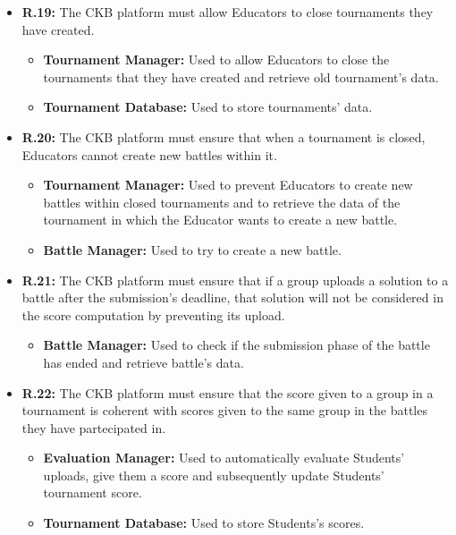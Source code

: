\documentclass{article}
\begin{document}
{\begin{itemize}
    \item \textbf{R.19:} The CKB platform must allow Educators to close tournaments they have created.
          \begin{itemize}
              \item \textbf{Tournament Manager:} Used to allow Educators to close the tournaments that they have
              created and retrieve old tournament's data.
              \item \textbf{Tournament Database:} Used to store tournaments' data.
          \end{itemize}
    \item \textbf{R.20:} The CKB platform must ensure that when a tournament is closed, Educators cannot create new battles
          within it.
          \begin{itemize}
              \item \textbf{Tournament Manager:} Used to prevent Educators to create new battles
                within closed tournaments and to retrieve the data of the tournament in which
                the Educator wants to create a new battle.
            \item \textbf{Battle Manager:} Used to try to create a new battle.
          \end{itemize}
    \item \textbf{R.21:} The CKB platform must ensure that if a group uploads a solution to a battle after the submission's deadline,
          that solution will not be considered in the score computation by preventing its upload.
          \begin{itemize}
              \item \textbf{Battle Manager:} Used to check if the submission phase of the battle has ended and
              retrieve battle's data. 
          \end{itemize}
    \item \textbf{R.22:} The CKB platform must ensure that the score given to a group in a tournament is
          coherent with scores given to the same group in the battles they have partecipated in.
          \begin{itemize}
              \item \textbf{Evaluation Manager:} Used to automatically evaluate Students' uploads,
              give them a score and subsequently update Students' tournament score.
              \item \textbf{Tournament Database:} Used to store Students's scores.
          \end{itemize}

\end{itemize}}
\end{document}
